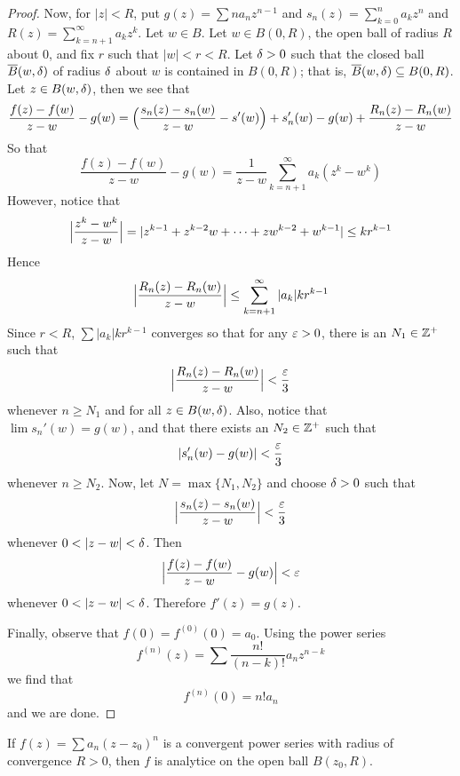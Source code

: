 \begin{proof}
    Now, for $|z|<R$, put  $g(z)=\sum{na_nz^{n-1}}$ and
    $s_n(z)=\sum_{k=0}^n{a_kz^n}$ and $R(z)=\sum_{k=n+1}^\infty{a_kz^k}$. Let $w
    \in B$. Let  $w \in B(0,R)$, the open ball of radius $R$ about $0$, and fix
    $r$ such that $|w|<r<R$. Let $\delta>0$ such that the closed ball
    $\overline{B}(w,\delta)$ of radius $\delta$ about  $w$ is contained in  $B(0,R)$; that
    is, $\overline{B}(w,\delta) \subseteq B(0,R)$. Let $z \in B(w,\delta)$, then we see that
    \begin{equation*}
        \frac{f(z)-f(w)}{z-w}-g(w)=\Big{(} \frac{s_n(z)-s_n(w)}{z-w}-s'(w) \Big{)}
        +s_n'(w)-g(w)+\frac{R_n(z)-R_n(w)}{z-w}
    \end{equation*}
    So that
    \begin{equation*}
        \frac{f(z)-f(w)}{z-w}-g(w)=\frac{1}{z-w}\sum_{k=n+1}^\infty{a_k(z^k-w^k)}
    \end{equation*}
    However, notice that
    \begin{equation*}
        \Big{|} \frac{z^k-w^k}{z-w}
        \Big{|}=|z^{k-1}+z^{k-2}w+\dots+zw^{k-2}+w^{k-1}| \leq kr^{k-1}
    \end{equation*}
    Hence
    \begin{equation*}
    \Big{|} \frac{R_n(z)-R_n(w)}{z-w} \Big{|} \leq
    \sum_{k=n+1}^\infty{|a_k|kr^{k-1}}
    \end{equation*}
    Since $r<R$,  $\sum{|a_k|kr^{k-1}}$ converges so that for any $\varepsilon>0$, there
    is an  $N_1 \in \mathbb{Z}^+$ such that
    \begin{equation*}
        \Big{|} \frac{R_n(z)-R_n(w)}{z-w} \Big{|}<\frac{\varepsilon}{3}
    \end{equation*}
    whenever $n \geq N_1$ and for all $z \in B(w,\delta)$. Also, notice that
    $\lim{s_n'(w)}=g(w)$, and that there exists an $N_2 \in \mathbb{Z}^+$ such that
    \begin{equation*}
        |s_n'(w)-g(w)|<\frac{\varepsilon}{3}
    \end{equation*}
    whenever $n \geq N_2$. Now, let $N=\max{\{N_1,N_2\}}$ and choose $\delta>0$ such
    that
    \begin{equation*}
        \Big{|} \frac{s_n(z)-s_n(w)}{z-w} \Big{|}<\frac{\varepsilon}{3}
    \end{equation*}
    whenever $0<|z-w|<\d$. Then
    \begin{equation*}
        \Big{|} \frac{f(z)-f(w)}{z-w}-g(w) \Big{|}<\varepsilon
    \end{equation*}
    whenever $0<|z-w|<\d$. Therefore  $f'(z)=g(z)$.

    Finally, observe that $f(0)=f^{(0)}(0)=a_0$. Using the power series
    \begin{equation*}
        f^{(n)}(z)=\sum{\frac{n!}{(n-k)!}a_nz^{n-k}}
    \end{equation*}
    we find that
    \begin{equation*}
        f^{(n)}(0)=n!a_n
    \end{equation*}
    and we are done.
\end{proof}
\begin{corollary}
    If $f(z)=\sum{a_n(z-z_0)^n}$ is a convergent power series with radius of
    convergence $R>0$, then $f$ is analytice on the open ball $B(z_0,R)$.
\end{corollary}

